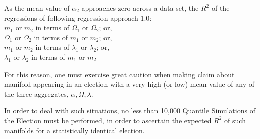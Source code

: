 \begin{corollary}
As the mean value of $\alpha_{2}$ approaches zero across a data set, the $R^2$ of the regressions of following regression approach 1.0:\\
$m_{1}$ or $m_{2}$ in terms of $\Omega_{1}$ or $\Omega_{2}$; or,\\
$\Omega_{1}$ or $\Omega_{2}$ in terms of $m_{1}$ or $m_{2}$; or,\\
$m_{1}$ or $m_{2}$ in terms of $\lambda_{1}$ or $\lambda_{2}$; or,\\
$\lambda_{1}$ or $\lambda_{2}$ in terms of $m_{1}$ or $m_{2}$
\end{corollary}

For this reason, one must exercise great caution when making claim about manifold appearing in an election with a very high (or low) mean value of any of the three aggregates, $\alpha, \Omega, \lambda$.

In order to deal with such situations, no less than 10,000 Quantile Simulations of the Election must be performed, in order to ascertain the expected $R^2$ of such manifolds for a statistically identical election.

